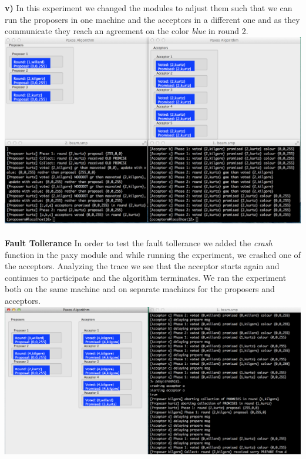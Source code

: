 \documentclass[a4paper, 11pt]{article}
\begin{document}
\textbf{v)} In this experiment we changed the modules to adjust them such that we can run the proposers in one machine and the acceptors in a different one and as they communicate they reach an agreement on the color \textit{blue} in round 2.\\
\includegraphics[scale=0.30]{images/exp9.png} \\\\
\newpage
\textbf{Fault Tollerance}
In order to test the fault tollerance we added the \textit{crash} function in the paxy module and while running the experiment, we crashed one of the acceptors. Analyzing the trace we see that the acceptor starts again and continues to participate and the algorithm terminates. We ran the experiment both on the same machine and on separate machines for the proposers and acceptors.\\
\includegraphics[scale=0.35]{images/exp10.png} \\\\
\end{document}
